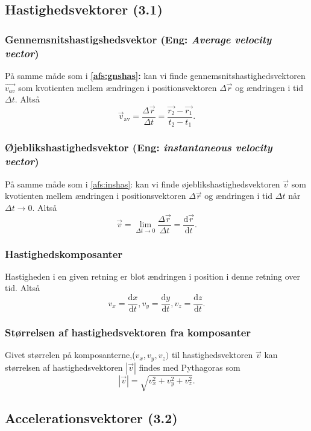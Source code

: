 \subsection{Hastighedsvektorer (3.1)}

\subsubsection{Gennemsnitshastigshedsvektor (Eng: \textit{Average velocity vector})} \label{afs:gnshasvec}
På samme måde som i \textbf{\ref{afs:gnshas}: } kan vi finde gennemsnitshastighedsvektoren $\Vec{v_{av}}$ som kvotienten mellem ændringen i positionsvektoren $\Delta \Vec{r}$ og ændringen i tid $\Delta t$. Altså
\[ 
\Vec{v}_{\text{av}} = \frac{\Delta \Vec{r}}{\Delta t} = \frac{\Vec{r_2} - \Vec{r_1}}{t_2 - t_1}
.\]


\subsubsection{Øjeblikshastighedsvektor (Eng: \textit{instantaneous velocity vector})} \label{afs:inshasvec}
På samme måde som i \ref{afs:inshas}:  kan vi finde øjeblikshastighedsvektoren $\Vec{v}$ som kvotienten mellem ændringen i positionsvektoren $\Delta \Vec{r}$ og ændringen i tid $\Delta t$ når $\Delta t \to 0$. Altså
\[ 
\Vec{v} = \lim_{\Delta t \to 0} \frac{\Delta \Vec{r}}{\Delta t} = \frac{\mathrm{d}\Vec{r}}{\mathrm{d}t}
.\]

\subsubsection{Hastighedskomposanter} \label{afs:haskom}
Hastigheden i en given retning er blot ændringen i position i denne retning over tid. Altså
\[ 
  v_x = \frac{\mathrm{d}x}{\mathrm{d}t}, v_y = \frac{\mathrm{d}y}{\mathrm{d}t}, v_z = \frac{\mathrm{d}z}{\mathrm{d}t}
.\]

\subsubsection{Størrelsen af hastighedsvektoren fra komposanter} \label{afs:komhas}
Givet størrelen på komposanterne,($v_x, v_y, v_z)$ til hastighedsvektoren $\Vec{v}$ kan størrelsen af hastighedsvektoren $\left| \Vec{v} \right|$ findes med Pythagoras som
\[
\left| \Vec{v} \right| = \sqrt{v_x^2 + v_y^2 + v_z^2}
.\]



\subsection{Accelerationsvektorer (3.2)}
